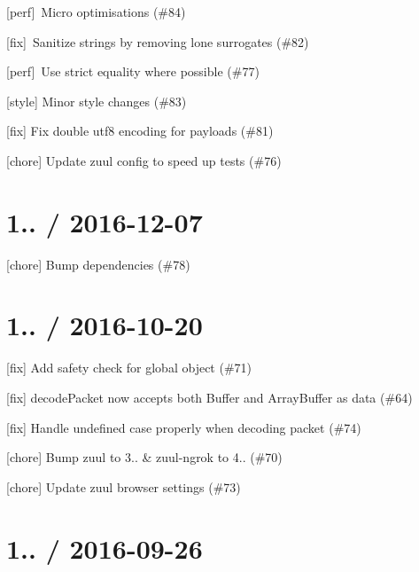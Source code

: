 \begin{DoxyItemize}
\item \mbox{[}perf\mbox{]} \+Micro optimisations (\#84)
\item \mbox{[}fix\mbox{]} \+Sanitize strings by removing lone surrogates (\#82)
\item \mbox{[}perf\mbox{]} \+Use strict equality where possible (\#77)
\item \mbox{[}style\mbox{]} Minor style changes (\#83)
\item \mbox{[}fix\mbox{]} Fix double utf8 encoding for payloads (\#81)
\item \mbox{[}chore\mbox{]} Update zuul config to speed up tests (\#76)
\end{DoxyItemize}

\section*{1.. / 2016-\/12-\/07 }


\begin{DoxyItemize}
\item \mbox{[}chore\mbox{]} Bump dependencies (\#78)
\end{DoxyItemize}

\section*{1.. / 2016-\/10-\/20 }


\begin{DoxyItemize}
\item \mbox{[}fix\mbox{]} Add safety check for global object (\#71)
\item \mbox{[}fix\mbox{]} decode\+Packet now accepts both Buffer and Array\+Buffer as data (\#64)
\item \mbox{[}fix\mbox{]} Handle undefined case properly when decoding packet (\#74)
\item \mbox{[}chore\mbox{]} Bump zuul to 3.. \& zuul-\/ngrok to 4.. (\#70)
\item \mbox{[}chore\mbox{]} Update zuul browser settings (\#73)
\end{DoxyItemize}

\section*{1.. / 2016-\/09-\/26 }


